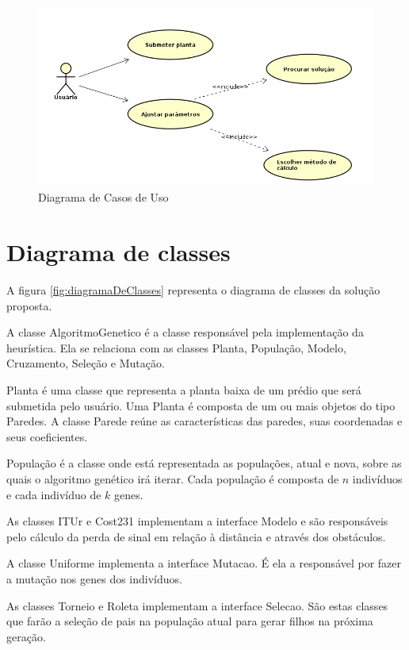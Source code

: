 \documentclass[tc,twoside]{iiufrgs}
\begin{document}
\begin{figure}[h]
\centering
\includegraphics[scale=0.55]{img/casosDeUso.png}
\caption{Diagrama de Casos de Uso}
\label{fig:casosDeUso}
\end{figure}

\section{Diagrama de classes}

A figura \ref{fig:diagramaDeClasses} representa o diagrama de classes da solução proposta. 

A classe AlgoritmoGenetico é a classe responsável pela implementação da heurística. Ela se relaciona com as classes Planta, População, Modelo, Cruzamento, Seleção e Mutação.

Planta é uma classe que representa a planta baixa de um prédio que será submetida pelo usuário. Uma Planta é composta de um ou mais objetos do tipo Paredes. A classe Parede reúne as características das paredes, suas coordenadas e seus coeficientes. 

População é a classe onde está representada as populações, atual e nova, sobre as quais o algoritmo genético irá iterar. Cada população é composta de $n$ indivíduos e cada indivíduo de $k$ genes. 

As classes ITUr e Cost231 implementam a interface Modelo e são responsáveis pelo cálculo da perda de sinal em relação à distância e através dos obstáculos.

A classe Uniforme implementa a interface Mutacao. É ela a responsável por fazer a mutação nos genes dos indivíduos.

As classes Torneio e Roleta implementam a interface Selecao. São estas classes que farão a seleção de pais na população atual para gerar filhos na próxima geração.
\end{document}
